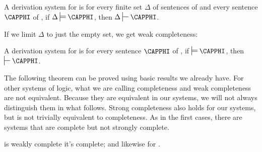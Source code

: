 \begin{majorILnc}{}
	A derivation system  for  is  \Iff for every finite set $\Delta$ of sentences of  and every sentence $\CAPPHI$ of , if $\Delta\sdtstile{}{}\CAPPHI$, then $\Delta\sststile{}{}\CAPPHI$.
\end{majorILnc} 
\noindent{}If we limit $\Delta$ to just the empty set, we get weak completeness:
\begin{majorILnc}{}
	A derivation system  for  is  \Iff for every sentence $\CAPPHI$ of , if $\sdtstile{}{}\CAPPHI$, then $\sststile{}{}\CAPPHI$.
\end{majorILnc} 
\noindent{}The following theorem can be proved using basic results we already have.  For other systems of logic, what we are calling completeness and weak completeness are not equivalent.  Because they are equivalent in our systems, we will not always distinguish them in what follows.  Strong completeness also holds for our systems, but is not trivially equivalent to completeness.  As in the first cases, there are systems that are complete but not strongly complete.
\begin{THEOREM}{}
	\GSD{} is weakly complete \Iff it's complete; and likewise for \GQD{}.
\end{THEOREM}
